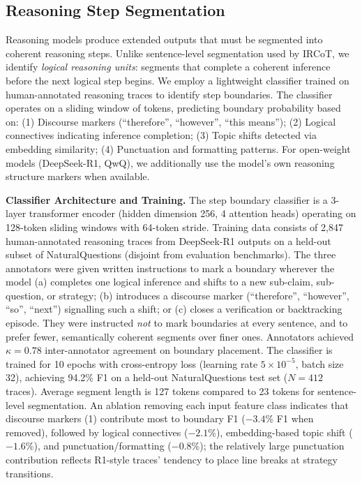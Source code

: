\documentclass[sigconf,natbib=true]{acmart}
\begin{document}
\subsection{Reasoning Step Segmentation}
\label{sec:segmentation}
Reasoning models produce extended outputs that must be segmented into coherent reasoning steps. Unlike sentence-level segmentation used by IRCoT, we identify \emph{logical reasoning units}: segments that complete a coherent inference before the next logical step begins. We employ a lightweight classifier trained on human-annotated reasoning traces to identify step boundaries. The classifier operates on a sliding window of tokens, predicting boundary probability based on: (1) Discourse markers (``therefore'', ``however'', ``this means''); (2) Logical connectives indicating inference completion; (3) Topic shifts detected via embedding similarity; (4) Punctuation and formatting patterns. For open-weight models (DeepSeek-R1, QwQ), we additionally use the model's own reasoning structure markers when available.

\textbf{Classifier Architecture and Training.} The step boundary classifier is a 3-layer transformer encoder (hidden dimension 256, 4 attention heads) operating on 128-token sliding windows with 64-token stride. Training data consists of 2,847 human-annotated reasoning traces from DeepSeek-R1 outputs on a held-out subset of NaturalQuestions (disjoint from evaluation benchmarks). The three annotators were given written instructions to mark a boundary wherever the model (a) completes one logical inference and shifts to a new sub-claim, sub-question, or strategy; (b) introduces a discourse marker (``therefore'', ``however'', ``so'', ``next'') signalling such a shift; or (c) closes a verification or backtracking episode. They were instructed \emph{not} to mark boundaries at every sentence, and to prefer fewer, semantically coherent segments over finer ones. Annotators achieved $\kappa=0.78$ inter-annotator agreement on boundary placement. The classifier is trained for 10 epochs with cross-entropy loss (learning rate $5 \times 10^{-5}$, batch size 32), achieving 94.2\% F1 on a held-out NaturalQuestions test set ($N=412$ traces). Average segment length is 127 tokens compared to 23 tokens for sentence-level segmentation. An ablation removing each input feature class indicates that discourse markers (1) contribute most to boundary F1 ($-3.4$\% F1 when removed), followed by logical connectives ($-2.1$\%), embedding-based topic shift ($-1.6$\%), and punctuation/formatting ($-0.8$\%); the relatively large punctuation contribution reflects R1-style traces' tendency to place line breaks at strategy transitions.
\end{document}
